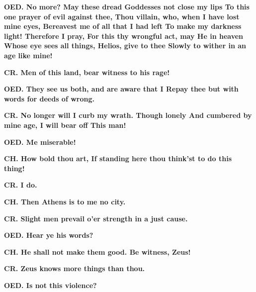 \documentclass[11pt,letter]{book}
\begin{document}
\par \textbf{OED. No more? May these dread Goddesses not close my lips To this one prayer of evil against thee, Thou villain, who, when I have lost mine eyes, Bereavest me of all that I had left To make my darkness light! Therefore I pray, For this thy wrongful act, may He in heaven Whose eye sees all things, Helios, give to thee Slowly to wither in an age like mine!}
\par 

\par \textbf{CR. Men of this land, bear witness to his rage!}
\par 

\par \textbf{OED. They see us both, and are aware that I Repay thee but with words for deeds of wrong.}
\par 

\par \textbf{CR. No longer will I curb my wrath. Though lonely And cumbered by mine age, I will bear off This man!}
\par 

\par \textbf{OED. Me miserable!}
\par 

\par \textbf{CH. How bold thou art, If standing here thou think’st to do this thing!}
\par 

\par \textbf{CR. I do.}
\par 

\par \textbf{CH. Then Athens is to me no city.}
\par 

\par \textbf{CR. Slight men prevail o’er strength in a just cause.}
\par 

\par \textbf{OED. Hear ye his words?}
\par 

\par \textbf{CH. He shall not make them good. Be witness, Zeus!}
\par 

\par \textbf{CR. Zeus knows more things than thou.}
\par 

\par \textbf{OED. Is not this violence?}
\par 
\end{document}
